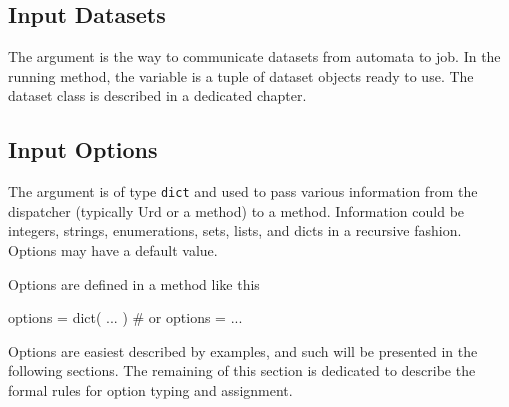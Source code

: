 \subsection{Input Datasets}
The \datasets argument is the way to communicate datasets from
automata to job.  In the running method, the \datasets variable is a
tuple of dataset objects ready to use.  The dataset class is described
in a dedicated chapter.




\subsection{Input Options}

The \options argument is of type \texttt{dict} and used to pass
various information from the dispatcher (typically Urd or a method) to
a method.  Information could be integers, strings, enumerations, sets,
lists, and dicts in a recursive fashion.  Options may have a default
value.

Options are defined in a method like this
\\
\begin{python}
  options = dict( ... )  # or
  options = { ... }
\end{python}

Options are easiest described by examples, and such will be presented
in the following sections.  The remaining of this section is dedicated
to describe the formal rules for option typing and assignment.

